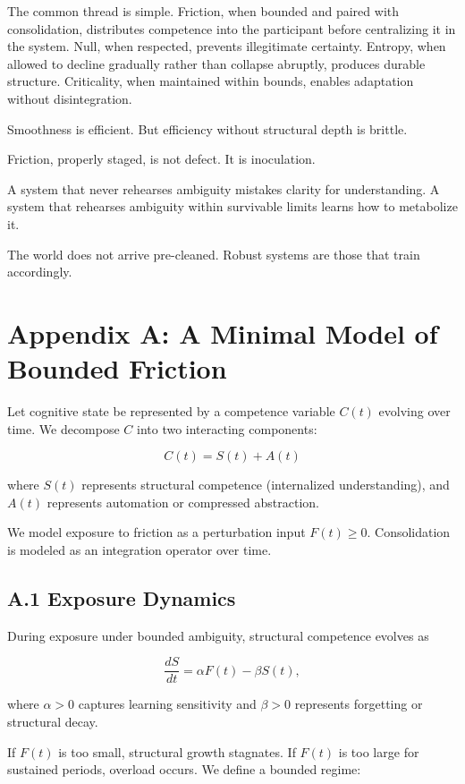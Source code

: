 \documentclass[12pt]{article}
\begin{document}
The common thread is simple. Friction, when bounded and paired with consolidation, distributes competence into the participant before centralizing it in the system. Null, when respected, prevents illegitimate certainty. Entropy, when allowed to decline gradually rather than collapse abruptly, produces durable structure. Criticality, when maintained within bounds, enables adaptation without disintegration.

Smoothness is efficient. But efficiency without structural depth is brittle.

Friction, properly staged, is not defect. It is inoculation.

A system that never rehearses ambiguity mistakes clarity for understanding. A system that rehearses ambiguity within survivable limits learns how to metabolize it.

The world does not arrive pre-cleaned. Robust systems are those that train accordingly.


\appendix

\section*{Appendix A: A Minimal Model of Bounded Friction}

Let cognitive state be represented by a competence variable $C(t)$ evolving over time. 
We decompose $C$ into two interacting components:

\[
C(t) = S(t) + A(t)
\]

where $S(t)$ represents structural competence (internalized understanding),
and $A(t)$ represents automation or compressed abstraction.

We model exposure to friction as a perturbation input $F(t) \ge 0$.
Consolidation is modeled as an integration operator over time.

\subsection*{A.1 Exposure Dynamics}

During exposure under bounded ambiguity, structural competence evolves as

\[
\frac{dS}{dt} = \alpha F(t) - \beta S(t),
\]

where $\alpha > 0$ captures learning sensitivity and 
$\beta > 0$ represents forgetting or structural decay.

If $F(t)$ is too small, structural growth stagnates.
If $F(t)$ is too large for sustained periods, overload occurs.
We define a bounded regime:
\end{document}
